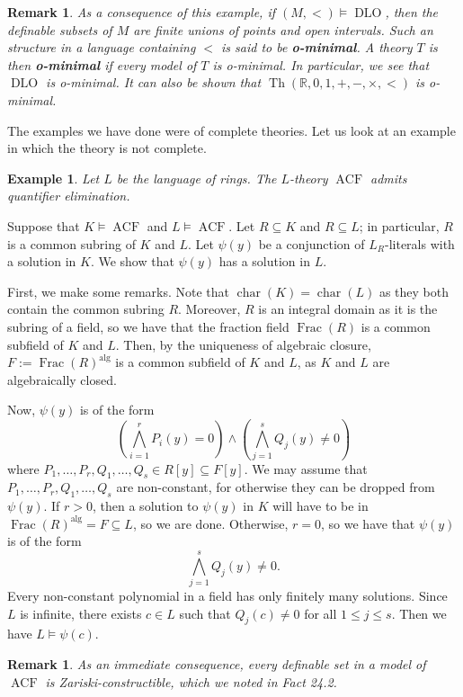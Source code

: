 \documentclass[10pt]{article}
\makeatletter
\newcommand{\R}{\mathbb{R}}
\DeclareMathOperator{\Th}{Th}
\DeclareMathOperator{\ACF}{ACF}
\DeclareMathOperator{\DLO}{DLO}
\DeclareMathOperator{\alg}{alg}
\DeclareMathOperator{\Frac}{Frac}
\DeclareMathOperator{\ch}{char}
\theoremstyle{newstyle}
\newtheorem{remark}[thm]{Remark}
\newtheorem{exmp}[thm]{Example}
\newenvironment{pf}[1][\proofname]{\par
  \pushQED{\qed}%
  \normalfont \topsep0\p@\relax
  \trivlist
  \item[\hskip\labelsep\scshape
  #1\@addpunct{.}]\ignorespaces
}{%
  \popQED\endtrivlist\@endpefalse
}
\makeatother
\begin{document}
\begin{remark}
As a consequence of this example, if $(M, <) \vDash \DLO$, then the definable subsets of $M$ 
are finite unions of points and open intervals. Such an structure in a language containing 
$<$ is said to be {\bf o-minimal}. A theory $T$ is then {\bf o-minimal} if every model of $T$ 
is o-minimal. In particular, we see that $\DLO$ is o-minimal. It can also be shown that 
$\Th(\R, 0, 1, +, -, \times, <)$ is o-minimal.
\end{remark}

The examples we have done were of complete theories. Let us look at an example in which the theory 
is not complete. 

\begin{exmp}
Let $L$ be the language of rings. The $L$-theory $\ACF$ admits quantifier elimination.
\end{exmp}
\begin{pf}
Suppose that $K \vDash \ACF$ and $L \vDash \ACF$. Let $R \subseteq K$ and $R \subseteq L$; 
in particular, $R$ is a common subring of $K$ and $L$. Let $\psi(y)$ be a conjunction of 
$L_R$-literals with a solution in $K$. We show that $\psi(y)$ has a solution in $L$. 

First, we make some remarks. Note that $\ch(K) = \ch(L)$ as they both contain the common 
subring $R$. Moreover, $R$ is an integral domain as it is the subring of a field, so we have that 
the fraction field $\Frac(R)$ is a common subfield of $K$ and $L$. Then, by the uniqueness of 
algebraic closure, $F := \Frac(R)^{\alg}$ is a common subfield of $K$ and $L$, 
as $K$ and $L$ are algebraically closed. 

Now, $\psi(y)$ is of the form 
\[ \left( \bigwedge_{i=1}^r P_i(y) = 0 \right) \wedge \left( \bigwedge_{j=1}^s Q_j(y) \neq 0 
\right) \] 
where $P_1, \dots, P_r, Q_1, \dots, Q_s \in R[y] \subseteq F[y]$. We may assume that 
$P_1, \dots, P_r, Q_1, \dots, Q_s$ are non-constant, for otherwise they can be dropped from
$\psi(y)$. If $r > 0$, then a solution to $\psi(y)$ in $K$ will have to be in 
$\Frac(R)^{\alg} = F \subseteq L$, so we are done. Otherwise, $r = 0$, so we have that 
$\psi(y)$ is of the form 
\[ \bigwedge_{j=1}^s Q_j(y) \neq 0. \]
Every non-constant polynomial in a field has only finitely many solutions. 
Since $L$ is infinite, there exists $c \in L$ such that $Q_j(c) \neq 0$ for all $1 \leq j \leq s$. 
Then we have $L \vDash \psi(c)$. 
\end{pf}

\begin{remark}
As an immediate consequence, every definable set in a model of $\ACF$ is Zariski-constructible, 
which we noted in Fact 24.2.
\end{remark}
\end{document}
